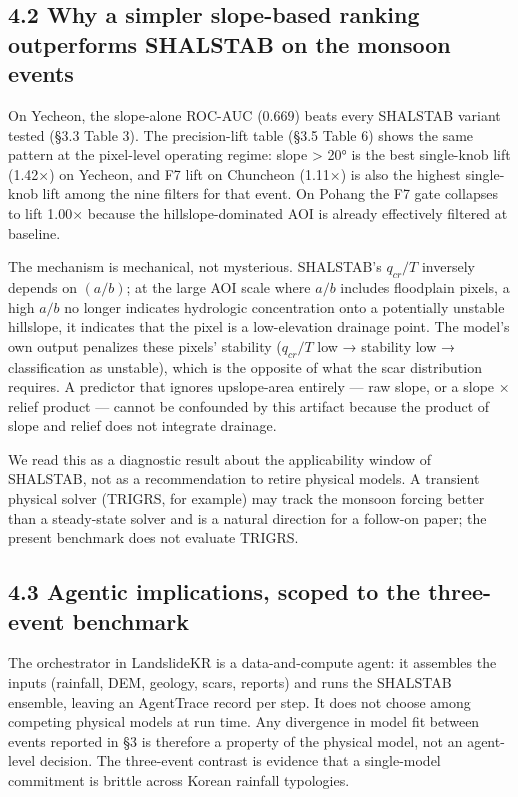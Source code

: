 \documentclass[11pt,a4paper]{article}
\begin{document}
\subsection{4.2 Why a simpler slope-based ranking outperforms SHALSTAB on the monsoon events}\label{why-a-simpler-slope-based-ranking-outperforms-shalstab-on-the-monsoon-events}

On Yecheon, the slope-alone ROC-AUC (0.669) beats every SHALSTAB variant tested (§3.3 Table 3). The precision-lift table (§3.5 Table 6) shows the same pattern at the pixel-level operating regime: slope \textgreater{} 20° is the best single-knob lift (1.42×) on Yecheon, and F7 lift on Chuncheon (1.11×) is also the highest single-knob lift among the nine filters for that event. On Pohang the F7 gate collapses to lift 1.00× because the hillslope-dominated AOI is already effectively filtered at baseline.

The mechanism is mechanical, not mysterious. SHALSTAB's \(q_{cr}/T\) inversely depends on \((a/b)\); at the large AOI scale where \(a/b\) includes floodplain pixels, a high \(a/b\) no longer indicates hydrologic concentration onto a potentially unstable hillslope, it indicates that the pixel is a low-elevation drainage point. The model's own output penalizes these pixels' stability (\(q_{cr}/T\) low → stability low → classification as unstable), which is the opposite of what the scar distribution requires. A predictor that ignores upslope-area entirely --- raw slope, or a slope × relief product --- cannot be confounded by this artifact because the product of slope and relief does not integrate drainage.

We read this as a diagnostic result about the applicability window of SHALSTAB, not as a recommendation to retire physical models. A transient physical solver (TRIGRS, for example) may track the monsoon forcing better than a steady-state solver and is a natural direction for a follow-on paper; the present benchmark does not evaluate TRIGRS.

\subsection{4.3 Agentic implications, scoped to the three-event benchmark}\label{agentic-implications-scoped-to-the-three-event-benchmark}

The orchestrator in LandslideKR is a data-and-compute agent: it assembles the inputs (rainfall, DEM, geology, scars, reports) and runs the SHALSTAB ensemble, leaving an AgentTrace record per step. It does not choose among competing physical models at run time. Any divergence in model fit between events reported in §3 is therefore a property of the physical model, not an agent-level decision. The three-event contrast is evidence that a single-model commitment is brittle across Korean rainfall typologies.
\end{document}
